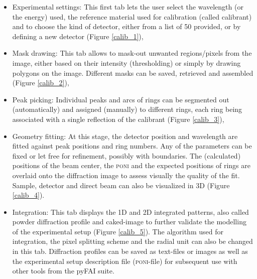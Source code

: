 \documentclass[preprint]{iucr}              %
\begin{document}
\begin{itemize}
  \item{Experimental settings:} This first tab lets the user select
  the wavelength (or the energy) used, the reference material used
  for calibration (called calibrant) and to choose the kind of detector, either from a 
  list of 50 provided, or by defining a new detector (Figure \ref{calib_1}),
  \item{Mask drawing:} This tab allows to mask-out unwanted regions/pixels from the
  image, either based on their intensity (thresholding) or simply by
  drawing polygons on the image. Different masks can be saved, retrieved and assembled (Figure \ref{calib_2}),
  \item{Peak picking:} Individual peaks and arcs of rings can be segmented out
  (automatically) and assigned (manually) to different rings, each ring 
  being associated with a single reflection of the calibrant (Figure
  \ref{calib_3}),
  \item{Geometry fitting:} At this stage, the detector position and
  wavelength are fitted against peak positions and ring numbers. 
  Any of the parameters can be fixed or let free for refinement, possibly with boundaries.
  The (calculated) positions of the beam center, the \textsc{poni}
  and the expected positions of rings are overlaid onto the diffraction image
  to assess visually the quality of the fit. Sample, detector 
  and direct beam can also be visualized in 3D (Figure \ref{calib_4}). 
  \item{Integration:} This tab displays the 1D and 2D integrated patterns, also
  called powder diffraction profile and caked-image to further validate the
  modelling of the experimental setup (Figure \ref{calib_5}). 
  The algorithm used for integration, the pixel splitting scheme and the radial unit
  can also be changed in this tab. 
  Diffraction profiles can be saved as text-files or images as well as the
  experimental setup description file (\textsc{poni}-file) for subsequent use with other tools from
  the pyFAI suite.
\end{itemize}
\end{document}
